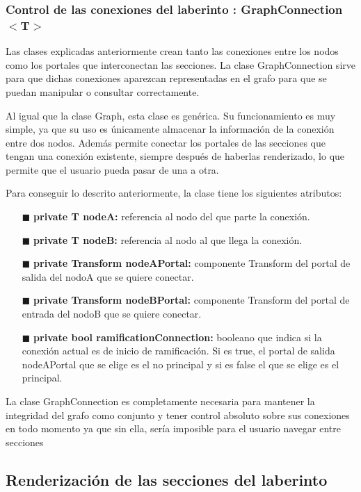 \documentclass[../main.tex]{subfiles}
\begin{document}
\subsubsection{Control de las conexiones del laberinto : GraphConnection$<$T$>$}

Las clases explicadas anteriormente crean tanto las conexiones entre los nodos como los portales que interconectan las secciones. La clase GraphConnection sirve para que dichas conexiones aparezcan representadas en el grafo para que se puedan manipular o consultar correctamente.

Al igual que la clase Graph, esta clase es genérica. Su funcionamiento es muy simple, ya que su uso es únicamente almacenar la información de la conexión entre dos nodos. Además permite conectar los portales de las secciones que tengan una conexión existente, siempre después de haberlas renderizado, lo que permite que el usuario pueda pasar de una a otra.

Para conseguir lo descrito anteriormente, la clase tiene los siguientes atributos:

\begin{itemize}
    \item[$\blacksquare$] \textbf{private T nodeA:} referencia al nodo del que parte la conexión.
    \item[$\blacksquare$] \textbf{private T nodeB:} referencia al nodo al que llega la conexión.
    \item[$\blacksquare$] \textbf{private Transform nodeAPortal:} componente Transform del portal de salida del nodoA que se quiere conectar.
    \item[$\blacksquare$] \textbf{private Transform nodeBPortal:} componente Transform del portal de entrada del nodoB que se quiere conectar.
    \item[$\blacksquare$] \textbf{private bool ramificationConnection:} booleano que indica si la conexión actual es de inicio de ramificación. Si es true, el portal de salida nodeAPortal que se elige es el no principal y si es false el que se elige es el principal.
\end{itemize}

La clase GraphConnection es completamente necesaria para mantener la integridad del grafo como conjunto y tener control absoluto sobre sus conexiones en todo momento ya que sin ella, sería imposible para el usuario navegar entre secciones

\subsection{Renderización de las secciones del laberinto}
\end{document}
